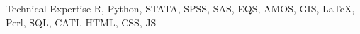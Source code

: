 \documentclass{resume} %
\begin{document}

\begin{rSection}{Technical Expertise}
\textsf{R}, Python, STATA, SPSS, SAS, EQS, AMOS, GIS, {\LaTeX}, Perl, SQL, CATI, HTML, CSS, JS

\end{rSection}

















\end{document}
